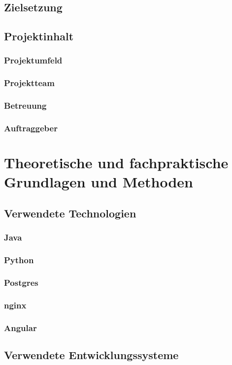 \documentclass[pdftex,11pt,a4paper]{book}
\begin{document}
\section{Zielsetzung}
\section{Projektinhalt}
\subsection{Projektumfeld}
\subsection{Projektteam}
\subsection{Betreuung}
\subsection{Auftraggeber}

\chapter{Theoretische und fachpraktische Grundlagen und Methoden}
\section{Verwendete Technologien}
\subsection{Java}
\subsection{Python}
\subsection{Postgres}
\subsection{nginx}
\subsection{Angular}
\section{Verwendete Entwicklungssysteme}
\end{document}
